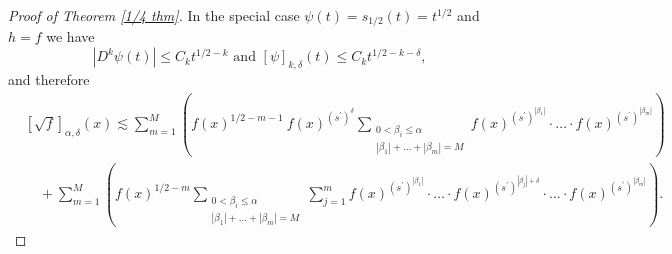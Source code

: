 \documentclass{amsart}
\theoremstyle{plain}
\numberwithin{equation}{section}
\begin{document}
\begin{proof}[Proof of Theorem \protect\ref{1/4 thm}]
In the special case $\psi(t)=s_{1/2}(t)=t^{1/2}$ and $h=f$ we have 
\begin{equation*}
|D^{k}\psi \left( t\right)|\leq C_k t^{1/2-k}\text{ and }\left[ \psi \right]
_{k,\delta }\left( t\right) \leq C_k t^{1/2 -k-\delta },
\end{equation*}%
and therefore 
\begin{align*}
&\left[ \sqrt{f}\right] _{\alpha ,\delta }(x) \lesssim \sum_{m=1}^{M}\left(
f(x)^{1/2-m-1}\ f\left( x\right) ^{\left( s^{\prime }\right) ^{\delta }}
\sum _{\substack{ 0<\beta _{i}\leq \alpha  \\ |\beta _{1}|+\dots +|\beta
_{m}|=M}}f\left( x\right) ^{\left( s^{\prime}\right) ^{|\beta_1| }} \cdot
\dots \cdot f\left( x\right) ^{\left( s^{\prime }\right) ^{|\beta_m| }}
\right) \\
& \quad +\sum_{m=1}^{M}\left( f(x)^{1/2-m} \sum_{\substack{ 0<\beta _{i}\leq
\alpha  \\ |\beta _{1}|+\dots +|\beta _{m}|=M}}\sum_{j=1}^{m}f\left(
x\right) ^{\left( s^{\prime }\right) ^{|\beta_1| }} \cdot \dots\cdot f\left(
x\right) ^{\left( s^{\prime }\right) ^{|\beta_j|+\delta }}\cdot\dots \cdot
f\left( x\right) ^{\left( s^{\prime }\right) ^{|\beta_m| }} \right) .
\end{align*}


\end{proof}
\end{document}

